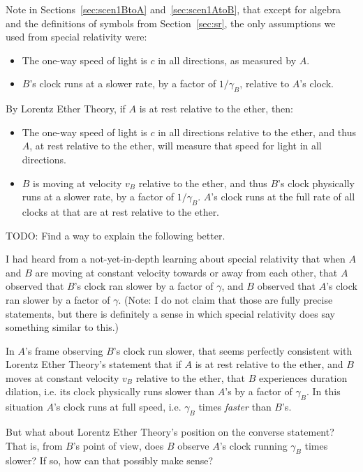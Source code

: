 \documentclass[a4paper]{article}
\theoremstyle{plain}
\theoremstyle{definition}
\begin{document}
Note in Sections~\ref{sec:scen1BtoA} and~\ref{sec:scen1AtoB}, that
except for algebra and the definitions of symbols from
Section~\ref{sec:sr}, the only assumptions we used from special relativity were:
\begin{itemize}
\item The one-way speed of light is $c$ in all directions, as measured
  by $A$.
\item $B$'s clock runs at a slower rate, by a factor of $1/\gamma_B$,
  relative to $A$'s clock.
\end{itemize}
By Lorentz Ether Theory, if $A$ is at rest relative to the ether, then:
\begin{itemize}
\item The one-way speed of light is $c$ in all directions relative to
  the ether, and thus $A$, at rest relative to the ether, will measure
  that speed for light in all directions.
\item $B$ is moving at velocity $v_B$ relative to the ether, and thus
  $B$'s clock physically runs at a slower rate, by a factor of
  $1/\gamma_B$.  $A$'s clock runs at the full rate of all clocks at
  that are at rest relative to the ether.
\end{itemize}

TODO: Find a way to explain the following better.

I had heard from a not-yet-in-depth learning about special relativity
that when $A$ and $B$ are moving at constant velocity towards or away
from each other, that $A$ observed that $B$'s clock ran slower by a
factor of $\gamma$, and $B$ observed that $A$'s clock ran slower by a
factor of $\gamma$.  (Note: I do not claim that those are fully
precise statements, but there is definitely a sense in which special
relativity does say something similar to this.)

In $A$'s frame observing $B$'s clock run slower, that seems perfectly
consistent with Lorentz Ether Theory's statement that if $A$ is at
rest relative to the ether, and $B$ moves at constant velocity $v_B$
relative to the ether, that $B$ experiences duration dilation,
i.e. its clock physically runs slower than $A$'s by a factor of
$\gamma_B$.  In this situation $A$'s clock runs at full speed,
i.e. $\gamma_B$ times {\em faster} than $B$'s.

But what about Lorentz Ether Theory's position on the converse
statement?  That is, from $B$'s point of view, does $B$ observe $A$'s
clock running $\gamma_B$ times slower?  If so, how can that possibly
make sense?
\end{document}
